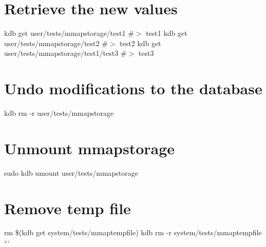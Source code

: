 \section*{Retrieve the new values}

kdb get user/tests/mmapstorage/test1 \#$>$ test1 kdb get user/tests/mmapstorage/test2 \#$>$ test2 kdb get user/tests/mmapstorage/test1/test3 \#$>$ test3

\section*{Undo modifications to the database}

kdb rm -\/r user/tests/mmapstorage

\section*{Unmount mmapstorage}

sudo kdb umount user/tests/mmapstorage

\section*{Remove temp file}

rm \$(kdb get system/tests/mmaptempfile) kdb rm -\/r system/tests/mmaptempfile ``` 